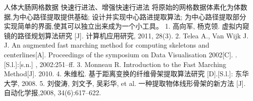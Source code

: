 \assignReq
{人体大肠网格数据}
{快速行进法、增强快速行进法}
{}
{}
{}
\assignWork
{将原始的网格数据体素化为体数据,为中心路径提取提供基础;}
{设计并实现中心路进提取算法;}
{为中心路径提取部分实现简单的界面,使其可以独立出来成为一个小工具。}
{}
{}
{}
\assignRef
{1. 高向军, 杨克领. 虚拟内窥镜的路径规划算法研究 [J]. 计算机应用研究, 2011, 28(3).}
{2. Telea A., Van Wijk J. J. An augmented fast marching method for computing }
{skeletons and centerlines[A]. Proceedings of the symposium on Data }
{Visualisation 2002[C]. .[S.l.]:[s.n.] , 2002:251–ff.}
{3. Monneau R. Introduction to the Fast Marching Method[J]. 2010.}
{4. 朱维松. 基于距离变换的纤维骨架提取算法研究 [D].[S.l.]: 东华大学, 2008.}
{5. 刘俊涛, 刘文予, 吴彩华, et al. 一种提取物体线形骨架的新方法 [J].}
{自动化学报,2008, 34(6):617–622.}
